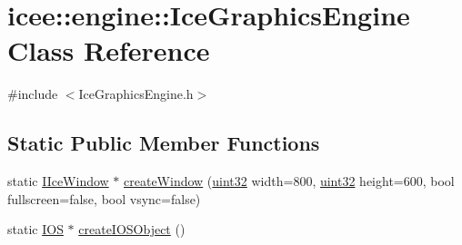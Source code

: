 \hypertarget{classicee_1_1engine_1_1IceGraphicsEngine}{
\section{icee::engine::IceGraphicsEngine Class Reference}
\label{classicee_1_1engine_1_1IceGraphicsEngine}
}


{\ttfamily \#include $<$IceGraphicsEngine.h$>$}

\subsection*{Static Public Member Functions}
\begin{DoxyCompactItemize}
\item 
static \hyperlink{classicee_1_1engine_1_1IIceWindow}{IIceWindow} $\ast$ \hyperlink{classicee_1_1engine_1_1IceGraphicsEngine_aeae25541a8ce27015a3309a3a6b5b0d5}{createWindow} (\hyperlink{namespacecompatibility_a51e8fe2956b4f39fe1fae96cec0d8393}{uint32} width=800, \hyperlink{namespacecompatibility_a51e8fe2956b4f39fe1fae96cec0d8393}{uint32} height=600, bool fullscreen=false, bool vsync=false)
\item 
static \hyperlink{classicee_1_1engine_1_1IOS}{IOS} $\ast$ \hyperlink{classicee_1_1engine_1_1IceGraphicsEngine_a1dd35f4e11dde8e57dce14788ed8a7e2}{createIOSObject} ()
\end{DoxyCompactItemize}


